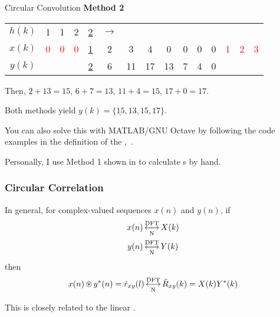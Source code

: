 \begin{example}{Circular Convolution}
  \textbf{Method 2}
  \begin{center}
    \begin{tabular}{ccccccccccccccc}
      \toprule
      $h(k)$ & 1 & 1 & 2 & \underline{2} & $\rightarrow$ & & & & & & & & & \\
      $x(k)$ & \textcolor{red}{0} & \textcolor{red}{0} & \textcolor{red}{0} & \underline{1} & 2 & 3 & 4 & 0 & 0 & 0 & 0 & \textcolor{red}{1} & \textcolor{red}{2} & \textcolor{red}{3} \\
      \midrule
      $y(k)$ & & & & \underline{2} & 6 & 11 & 17 & 13 & 7 & 4 & 0 & & & \\
      \bottomrule
    \end{tabular}
  \end{center}
  Then, $\underline{2} + 13 = 15$, $6 + 7 = 13$, $11 + 4 = 15$, $17 + 0 = 17$.
  \newline

  Both methods yield $y(k) = \lbrace \underline{15}, 13, 15, 17 \rbrace$.

  \begin{remark*}
    You can also solve this with MATLAB/GNU Octave by following the code examples in the definition of the ,~.
  \end{remark*}
\end{example}

\begin{remark*}
  Personally, I use Method 1 shown in  to calculate s by hand.
\end{remark*}

\subsubsection{Circular Correlation}\label{subsubsec:DFT_Properties-Circular_Correlation}
In general, for complex-valued sequences $x(n)$ and $y(n)$, if
\begin{align*}
  x(n) &\operatorname{\overset{\text{DFT}}{\underset{N}{\longleftrightarrow}}} X(k) \\
  y(n) &\operatorname{\overset{\text{DFT}}{\underset{N}{\longleftrightarrow}}} Y(k)
\end{align*}
then
\begin{equation}\label{eq:DFT_Properties-Circular_Correlation}
  x(n) \operatorname{\circledast} y^{*}(n) = \tilde{r}_{xy}(l) \operatorname{\overset{\text{DFT}}{\underset{N}{\longleftrightarrow}}} \tilde{R}_{xy}(k) = X(k)Y^{*}(k)
\end{equation}
\begin{remark*}
  This is closely related to the linear .
\end{remark*}

